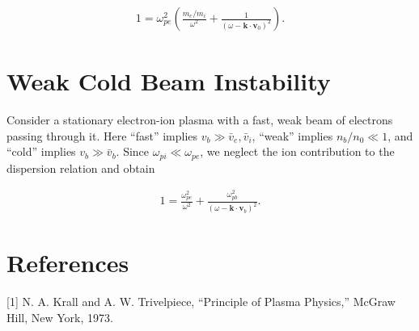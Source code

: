 \documentclass[12pt]{article}
\newcommand{\mb}{\mathbf}
\begin{document}
\begin{align*}
1 = \omega_{pe}^2 \left(\frac{m_e/m_i}{\omega^2} + \frac{1}{(\omega - \mb{k} \cdot \mb{v}_0)^2}\right).
\end{align*}



\section*{Weak Cold Beam Instability}
Consider a stationary electron-ion plasma with a fast, weak beam of electrons passing through it. Here ``fast'' implies $v_b \gg \bar{v}_e, \bar{v}_i$, ``weak'' implies $n_b/n_0 \ll 1$, and ``cold'' implies $v_b \gg \bar{v}_b$. Since $\omega_{pi} \ll \omega_{pe}$, we neglect the ion contribution to the dispersion relation and obtain

\begin{align*}
1 = \frac{\omega_{pe}^2}{\omega^2} + \frac{\omega_{pb}^2}{(\omega-\mb{k} \cdot \mb{v}_b)^2}.
\end{align*}

\section*{References}
[1] N. A. Krall and A. W. Trivelpiece, ``Principle of Plasma Physics,'' McGraw Hill, New York, 1973.
\end{document}
